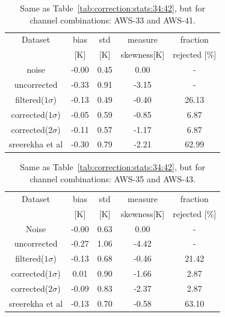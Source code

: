 \documentclass[12pt]{article}
\begin{document}
\begin{table}[!bt]
	\centering
	\begin{tabular}[b]{c|c|c|c|c}
		Dataset  		  &   bias &   std &   measure  & fraction\\
						&   [K]  &   [K] & skewness[K]  & rejected [\%]\\
		\hline
	noise       	    	&  -0.00 &  0.45 &               0.00 &               - \\
	uncorrected	    		&  -0.33 &  0.91 &              -3.15 &                - \\
	filtered($1\sigma$)  	&  -0.13 &  0.49 &              -0.40 &               26.13 \\
	corrected($1\sigma$) 	&  -0.05 &  0.59 &              -0.85 &                6.87 \\
	corrected($2\sigma$) 	&  -0.11 &  0.57 &              -1.17 &                6.87 \\
	sreerekha et al   		&  -0.30 &  0.79 &              -2.21 &               62.99 \\

		\hline
	\end{tabular}
	\caption{Same as Table~\ref{tab:correction:stats:34:42}, but for channel combinations: AWS-33 and AWS-41.   }
	\label{tab:correction:stats:33:41}
\end{table}

\begin{table}[!bt]
	\centering
	\begin{tabular}[b]{c|c|c|c|c}
		Dataset  		  &   bias &   std &   measure & fraction \\
							&   [K]  &   [K] & skewness[K] & rejected [\%]\\
		\hline
 Noise           	  &  -0.00 &  0.63 &               0.00 &                -\\
uncorrected     	  &  -0.27 &  1.06 &              -4.42 &                - \\
filtered($1\sigma$)	  &  -0.13 &  0.68 &              -0.46 &               21.42 \\
corrected($1\sigma$)  &   0.01 &  0.90 &              -1.66 &                2.87 \\
corrected($2\sigma$)  &  -0.09 &  0.83 &              -2.37 &                2.87 \\
sreerekha et al  	  &  -0.13 &  0.70 &              -0.58 &               63.10 \\

		\hline
	\end{tabular}
	\caption{Same as Table~\ref{tab:correction:stats:34:42}, but for channel combinations: AWS-35 and AWS-43.   }
	\label{tab:correction:stats:35:43}
\end{table}
\end{document}
